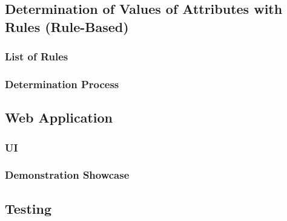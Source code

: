 \subsection{Determination of Values of Attributes with Rules (Rule-Based)}
    \subsubsection{List of Rules}
    
    \subsubsection{Determination Process}
    
\subsection{Web Application}
    \subsubsection{UI}
    
    \subsubsection{Demonstration Showcase}
    
\subsection{Testing}